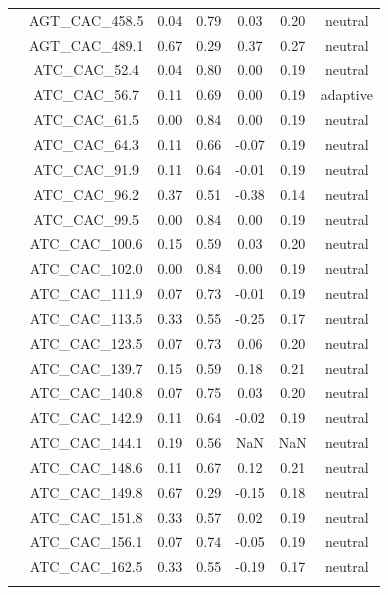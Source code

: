 \documentclass[11pt,]{article}
\begin{document}
\begin{longtable}[c]{@{}lcccccc@{}}
\\\addlinespace
& AGT\_CAC\_458.5 & 0.04 & 0.79 & 0.03 & 0.20 & neutral
\\\addlinespace
& AGT\_CAC\_489.1 & 0.67 & 0.29 & 0.37 & 0.27 & neutral
\\\addlinespace
& ATC\_CAC\_52.4 & 0.04 & 0.80 & 0.00 & 0.19 & neutral
\\\addlinespace
& ATC\_CAC\_56.7 & 0.11 & 0.69 & 0.00 & 0.19 & adaptive
\\\addlinespace
& ATC\_CAC\_61.5 & 0.00 & 0.84 & 0.00 & 0.19 & neutral
\\\addlinespace
& ATC\_CAC\_64.3 & 0.11 & 0.66 & -0.07 & 0.19 & neutral
\\\addlinespace
& ATC\_CAC\_91.9 & 0.11 & 0.64 & -0.01 & 0.19 & neutral
\\\addlinespace
& ATC\_CAC\_96.2 & 0.37 & 0.51 & -0.38 & 0.14 & neutral
\\\addlinespace
& ATC\_CAC\_99.5 & 0.00 & 0.84 & 0.00 & 0.19 & neutral
\\\addlinespace
& ATC\_CAC\_100.6 & 0.15 & 0.59 & 0.03 & 0.20 & neutral
\\\addlinespace
& ATC\_CAC\_102.0 & 0.00 & 0.84 & 0.00 & 0.19 & neutral
\\\addlinespace
& ATC\_CAC\_111.9 & 0.07 & 0.73 & -0.01 & 0.19 & neutral
\\\addlinespace
& ATC\_CAC\_113.5 & 0.33 & 0.55 & -0.25 & 0.17 & neutral
\\\addlinespace
& ATC\_CAC\_123.5 & 0.07 & 0.73 & 0.06 & 0.20 & neutral
\\\addlinespace
& ATC\_CAC\_139.7 & 0.15 & 0.59 & 0.18 & 0.21 & neutral
\\\addlinespace
& ATC\_CAC\_140.8 & 0.07 & 0.75 & 0.03 & 0.20 & neutral
\\\addlinespace
& ATC\_CAC\_142.9 & 0.11 & 0.64 & -0.02 & 0.19 & neutral
\\\addlinespace
& ATC\_CAC\_144.1 & 0.19 & 0.56 & NaN & NaN & neutral
\\\addlinespace
& ATC\_CAC\_148.6 & 0.11 & 0.67 & 0.12 & 0.21 & neutral
\\\addlinespace
& ATC\_CAC\_149.8 & 0.67 & 0.29 & -0.15 & 0.18 & neutral
\\\addlinespace
& ATC\_CAC\_151.8 & 0.33 & 0.57 & 0.02 & 0.19 & neutral
\\\addlinespace
& ATC\_CAC\_156.1 & 0.07 & 0.74 & -0.05 & 0.19 & neutral
\\\addlinespace
& ATC\_CAC\_162.5 & 0.33 & 0.55 & -0.19 & 0.17 & neutral
\\\addlinespace

\end{longtable}
\end{document}
